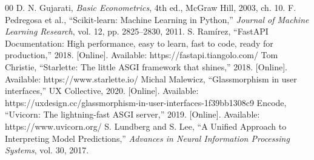\documentclass[conference]{IEEEtran}
\begin{document}
\begin{thebibliography}{00}
 D. N. Gujarati, \textit{Basic Econometrics}, 4th ed., McGraw Hill, 2003, ch. 10.
 F. Pedregosa et al., ``Scikit-learn: Machine Learning in Python,'' \textit{Journal of Machine Learning Research}, vol. 12, pp. 2825--2830, 2011.
 S. Ramírez, ``FastAPI Documentation: High performance, easy to learn, fast to code, ready for production,'' 2018. [Online]. Available: https://fastapi.tiangolo.com/
 Tom Christie, ``Starlette: The little ASGI framework that shines,'' 2018. [Online]. Available: https://www.starlette.io/
 Michal Malewicz, ``Glassmorphism in user interfaces,'' UX Collective, 2020. [Online]. Available: https://uxdesign.cc/glassmorphism-in-user-interfaces-1f39bb1308c9
 Encode, ``Uvicorn: The lightning-fast ASGI server,'' 2019. [Online]. Available: https://www.uvicorn.org/
 S. Lundberg and S. Lee, ``A Unified Approach to Interpreting Model Predictions,'' \textit{Advances in Neural Information Processing Systems}, vol. 30, 2017.

\end{thebibliography}
\end{document}
